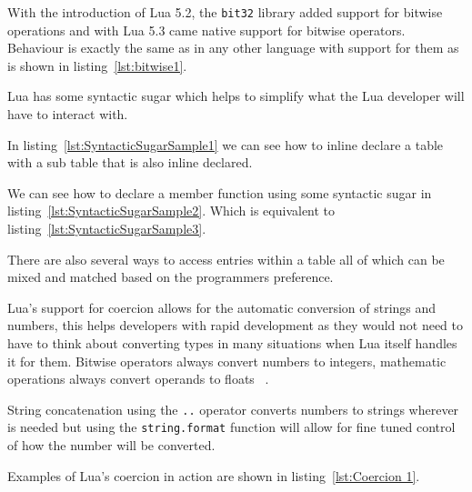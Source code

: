 \documentclass[11pt,a4paper,titlepage]{article}
\begin{document}
			With the introduction of Lua 5.2, the \texttt{bit32} library added support for bitwise operations and with Lua 5.3 came native support for bitwise operators. Behaviour is exactly the same as in any other language with support for them as is shown in listing~\ref{lst:bitwise1}.
			 

			Lua has some syntactic sugar which helps to simplify what the Lua developer will have to interact with.
			
			
			In listing~\ref{lst:SyntacticSugarSample1} we can see how to inline declare a table with a sub table that is also inline declared.

			
			We can see how to declare a member function using some syntactic sugar in listing~\ref{lst:SyntacticSugarSample2}. Which is equivalent to listing~\ref{lst:SyntacticSugarSample3}.

			

			There are also several ways to access entries within a table all of which can be mixed and matched based on the programmers preference.

			

			Lua's support for coercion allows for the automatic conversion of strings and numbers, this helps developers with rapid development as they would not need to have to think about converting types in many situations when Lua itself handles it for them. Bitwise operators always convert numbers to integers, mathematic operations always convert operands to floats ~\cite{LuaMan}.
			
			String concatenation using the \texttt{..} operator converts numbers to strings wherever is needed but using the \texttt{string.format} function will allow for fine tuned control of how the number will be converted.

			Examples of Lua's coercion in action are shown in listing~\ref{lst:Coercion 1}.
			
\end{document}
